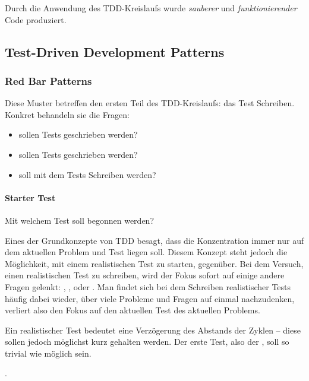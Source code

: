 {Durch die Anwendung des TDD-Kreislaufs wurde \textit{sauberer} und \textit{funktionierender} Code produziert.

\subsection{Test-Driven Development Patterns}
\subsubsection{Red Bar Patterns}

Diese Muster betreffen den ersten Teil des TDD-Kreislaufs: das Test Schreiben.
Konkret behandeln sie die Fragen:
\begin{itemize}
  \item {} sollen Tests geschrieben werden?
  \item {} sollen Tests geschrieben werden?
  \item {} soll mit dem Tests Schreiben  werden?
\end{itemize}

\paragraph{Starter Test}
Mit welchem Test soll begonnen werden?

Eines der Grundkonzepte von TDD besagt, dass die Konzentration immer nur auf dem aktuellen Problem und Test liegen soll. Diesem Konzept steht jedoch die Möglichkeit, mit einem realistischen Test zu starten, gegenüber. Bei dem Versuch, einen realistischen Test zu schreiben, wird der Fokus sofort auf einige andere Fragen gelenkt: , ,  oder . Man findet sich bei dem Schreiben realistischer Tests häufig dabei wieder, über viele Probleme und Fragen auf einmal nachzudenken, verliert also den Fokus auf den aktuellen Test des aktuellen Problems.

Ein realistischer Test bedeutet eine Verzögerung des Abstands der  Zyklen -- diese sollen jedoch möglichst kurz gehalten werden. Der erste Test, also der , soll so trivial wie möglich sein.

 \autocite[134]{Beck:2003}.

}
